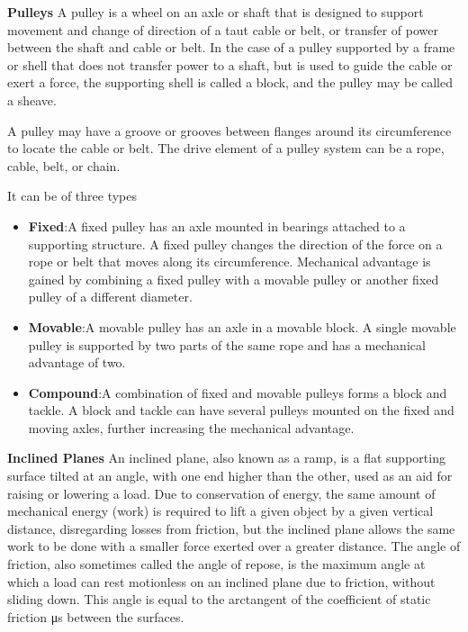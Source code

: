 \begin{phybox}{}
{\textbf{Pulleys}
A pulley is a wheel on an axle or shaft that is designed to support movement and change of direction of a taut cable or belt, or transfer of power between the shaft and cable or belt. In the case of a pulley supported by a frame or shell that does not transfer power to a shaft, but is used to guide the cable or exert a force, the supporting shell is called a block, and the pulley may be called a sheave.

A pulley may have a groove or grooves between flanges around its circumference to locate the cable or belt. The drive element of a pulley system can be a rope, cable, belt, or chain.

It can be of three types
\begin{itemize}
    \item {\textbf{Fixed}:A fixed pulley has an axle mounted in bearings attached to a supporting structure. A fixed pulley changes the direction of the force on a rope or belt that moves along its circumference. Mechanical advantage is gained by combining a fixed pulley with a movable pulley or another fixed pulley of a different diameter.}
    \item {\textbf{Movable}:A movable pulley has an axle in a movable block. A single movable pulley is supported by two parts of the same rope and has a mechanical advantage of two.}
    \item {\textbf{Compound}:A combination of fixed and movable pulleys forms a block and tackle. A block and tackle can have several pulleys mounted on the fixed and moving axles, further increasing the mechanical advantage.}
 \end{itemize}   

\textbf{Inclined Planes}
An inclined plane, also known as a ramp, is a flat supporting surface tilted at an angle, with one end higher than the other, used as an aid for raising or lowering a load.
Due to conservation of energy, the same amount of mechanical energy (work) is required to lift a given object by a given vertical distance, disregarding losses from friction, but the inclined plane allows the same work to be done with a smaller force exerted over a greater distance.
The angle of friction, also sometimes called the angle of repose, is the maximum angle at which a load can rest motionless on an inclined plane due to friction, without sliding down. This angle is equal to the arctangent of the coefficient of static friction μs between the surfaces.

}
\end{phybox}

